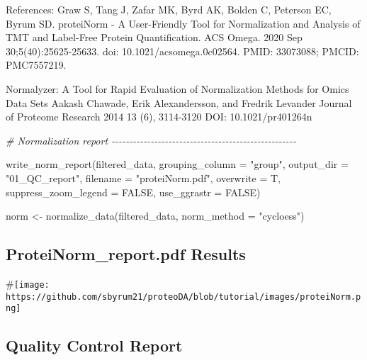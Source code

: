 \documentclass[
]{article}
\newenvironment{Shaded}{\begin{snugshade}}{\end{snugshade}}
\newcommand{\AttributeTok}[1]{\textcolor[rgb]{0.77,0.63,0.00}{#1}}
\newcommand{\CommentTok}[1]{\textcolor[rgb]{0.56,0.35,0.01}{\textit{#1}}}
\newcommand{\ConstantTok}[1]{\textcolor[rgb]{0.00,0.00,0.00}{#1}}
\newcommand{\FunctionTok}[1]{\textcolor[rgb]{0.00,0.00,0.00}{#1}}
\newcommand{\NormalTok}[1]{#1}
\newcommand{\OtherTok}[1]{\textcolor[rgb]{0.56,0.35,0.01}{#1}}
\newcommand{\StringTok}[1]{\textcolor[rgb]{0.31,0.60,0.02}{#1}}
\begin{document}
References: Graw S, Tang J, Zafar MK, Byrd AK, Bolden C, Peterson EC,
Byrum SD. proteiNorm - A User-Friendly Tool for Normalization and
Analysis of TMT and Label-Free Protein Quantification. ACS Omega. 2020
Sep 30;5(40):25625-25633. doi: 10.1021/acsomega.0c02564. PMID: 33073088;
PMCID: PMC7557219.

Normalyzer: A Tool for Rapid Evaluation of Normalization Methods for
Omics Data Sets Aakash Chawade, Erik Alexandersson, and Fredrik Levander
Journal of Proteome Research 2014 13 (6), 3114-3120 DOI:
10.1021/pr401264n

\begin{Shaded}
\begin{Highlighting}[]
\CommentTok{\# Normalization report {-}{-}{-}{-}{-}{-}{-}{-}{-}{-}{-}{-}{-}{-}{-}{-}{-}{-}{-}{-}{-}{-}{-}{-}{-}{-}{-}{-}{-}{-}{-}{-}{-}{-}{-}{-}{-}{-}{-}{-}{-}{-}{-}{-}{-}{-}{-}{-}{-}{-}{-}{-}}

\FunctionTok{write\_norm\_report}\NormalTok{(filtered\_data,}
                  \AttributeTok{grouping\_column =} \StringTok{"group"}\NormalTok{,}
                  \AttributeTok{output\_dir =} \StringTok{"01\_QC\_report"}\NormalTok{,}
                  \AttributeTok{filename =} \StringTok{"proteiNorm.pdf"}\NormalTok{,}
                  \AttributeTok{overwrite =}\NormalTok{ T,}
                  \AttributeTok{suppress\_zoom\_legend =} \ConstantTok{FALSE}\NormalTok{,}
                  \AttributeTok{use\_ggrastr =} \ConstantTok{FALSE}\NormalTok{)}

\NormalTok{norm }\OtherTok{\textless{}{-}} \FunctionTok{normalize\_data}\NormalTok{(filtered\_data,}
                       \AttributeTok{norm\_method =} \StringTok{"cycloess"}\NormalTok{)}
\end{Highlighting}
\end{Shaded}

\hypertarget{proteinorm_report.pdf-results}{%
\subsection{ProteiNorm\_report.pdf
Results}\label{proteinorm_report.pdf-results}}

\#\texttt{[image: https://github.com/sbyrum21/proteoDA/blob/tutorial/images/proteiNorm.png]}

\hypertarget{quality-control-report}{%
\subsection{Quality Control Report}\label{quality-control-report}}
\end{document}
